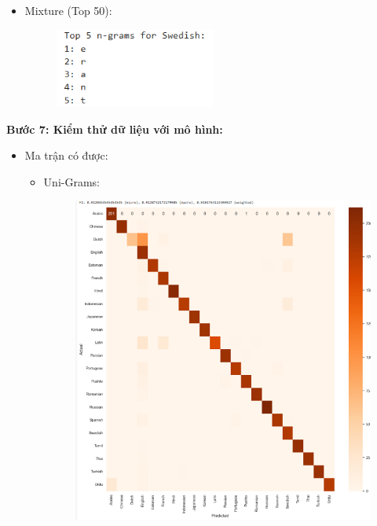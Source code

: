 \begin{itemize}
\begin{figure}[H]
\end{figure}
    \item Mixture (Top 50):
    \begin{figure}[H]
    \centering
    \includegraphics[width=0.5\textwidth]{img/docspics/Picture14.png}
\end{figure}
\end{itemize}
\clearpage
\textbf{Bước 7: Kiểm thử dữ liệu với mô hình:}

\begin{itemize}
    \item Ma trận có được:
    \begin{itemize}
        \item Uni-Grams:
        \begin{figure}[H]
    \centering
    \includegraphics[width=1\textwidth]{img/docspics/Picture15.png}
\end{figure}
\clearpage

\end{itemize}
\end{itemize}
